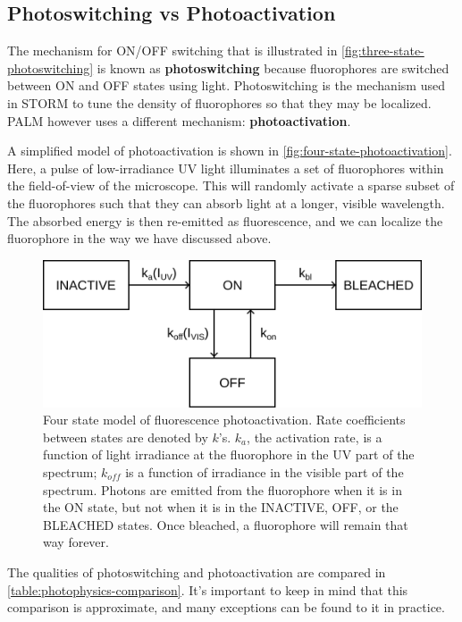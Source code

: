 \documentclass[10pt,a4paper]{book}
\begin{document}
\subsection{Photoswitching vs Photoactivation}

The mechanism for ON/OFF switching that is illustrated in \autoref{fig:three-state-photoswitching} is known as \textbf{photoswitching} because fluorophores are switched between ON and OFF states using light. Photoswitching is the mechanism used in STORM to tune the density of fluorophores so that they may be localized. PALM however uses a different mechanism: \textbf{photoactivation}.

A simplified model of photoactivation is shown in \autoref{fig:four-state-photoactivation}. Here, a pulse of low-irradiance UV light illuminates a set of fluorophores within the field-of-view of the microscope. This will randomly activate a sparse subset of the fluorophores such that they can absorb light at a longer, visible wavelength. The absorbed energy is then re-emitted as fluorescence, and we can localize the fluorophore in the way we have discussed above.

\begin{figure}[ht]
    \centering
    \includegraphics{four-state-photoactivation-model.png}
    \caption{Four state model of fluorescence photoactivation. Rate coefficients between states are denoted by $k$'s. $k_a$, the activation rate, is a function of light irradiance at the fluorophore in the UV part of the spectrum; $k_{off}$ is a function of irradiance in the visible part of the spectrum. Photons are emitted from the fluorophore when it is in the ON state, but not when it is in the INACTIVE, OFF, or the BLEACHED states. Once bleached, a fluorophore will remain that way forever.}
    \label{fig:four-state-photoactivation}
\end{figure}

The qualities of photoswitching and photoactivation are compared in \autoref{table:photophysics-comparison}. It's important to keep in mind that this comparison is approximate, and many exceptions can be found to it in practice.
\end{document}
